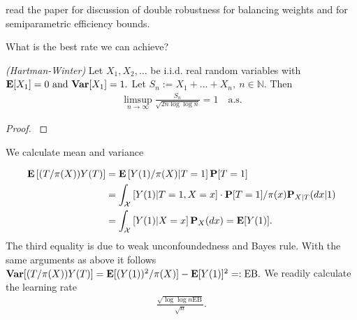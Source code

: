 read the paper \cite{Zhao2017a} for discussion of double robustness for balancing weights and \cite{Hahn1998} for semiparametric efficiency bounds.


What is the best rate we can achieve?

\begin{theorem}
  \emph{(Hartman-Winter)}
  Let 
  $
    X_1,
    X_2,
    \ldots
  $
  be i.i.d. real random variables with 
  $
    \E[X_1]=0
    \ 
    \text{and}
    \ 
    \mathbf{Var}
    [X_1]
    = 1.
  $
  Let
  $
    S_n
    :=
    X_1
    +
    \ldots
    +
    X_n,
    \ 
    n\in \mathbb{N}
    .
  $
  Then
  \begin{gather}
    \limsup_{n\to\infty}
    \frac{S_n}{
      \sqrt{
        2n
        \log
        \log
        n
      }
    }
    =
    1
    \quad
    \text{a.s.}
  \end{gather}
\end{theorem}
\begin{proof}
  \cite[Theorem~22.11]{Klenke2020}
\end{proof}


We calculate mean and variance

\begin{align}
  \mathbf{E}
  \left[ 
    (T/\pi(X))
    Y(T)
  \right]
  &=
  \mathbf{E}
  \left[ 
    Y(1)
    /\pi(X)
    \vert
    T=1
  \right]
  \mathbf{P}[T=1]
  \\
  &=
  \int_\mathcal{X}
  \left[ 
    Y(1)
    \vert
    T=1,
    X=x
  \right]
  \cdot
  \mathbf{P}[T=1]
  /
  \pi(x)
  \mathbf{P}_{X|T}(dx|1)
  \\
  &=
  \int_\mathcal{X}
  \left[ 
    Y(1)
    \vert
    X=x
  \right]
  \mathbf{P}_X(dx)
  =
  \mathbf{E}[Y(1)]
  .
\end{align}
The third equality is due to weak unconfoundedness and Bayes rule.
With the same arguments as above it follows
$
  \mathbf{Var}
  [
    (T/\pi(X))
    Y(T)
  ]
    =
    \mathbf{E}[
    (Y(1))^2
    /
    \pi(X)
    ]
    -
    \mathbf{E}[Y(1)]^2
    =:
    \mathrm{EB}
    .
$
We readily calculate the learning rate 
\begin{gather}
  \frac{\sqrt{\log\log n \mathrm{EB}}}{\sqrt{n}}
  .
\end{gather}
